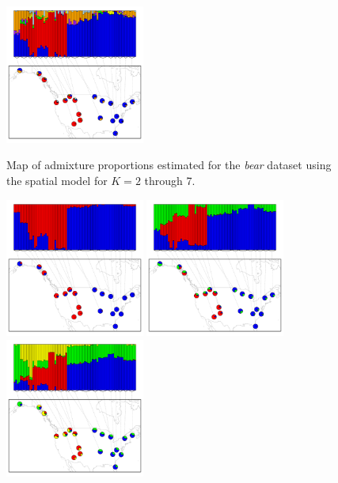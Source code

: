 \documentclass[12pt]{article}
\begin{document}
\begin{figure}
			{\includegraphics[width=1.8in,height=1.8in]{figs/bears/bear_sp7.pdf}}
	\caption{
	Map of admixture proportions estimated for the \textit{bear} dataset 
	using the spatial model for $K=2$ through 7.
    }\label{bear_sp_pies}
\end{figure}

\begin{figure}
	\centering
			{\includegraphics[width=1.8in,height=1.8in]{figs/bears/bear_nsp2.pdf}}
			{\includegraphics[width=1.8in,height=1.8in]{figs/bears/bear_nsp3.pdf}}
			{\includegraphics[width=1.8in,height=1.8in]{figs/bears/bear_nsp4.pdf}}

\end{figure}
\end{document}
